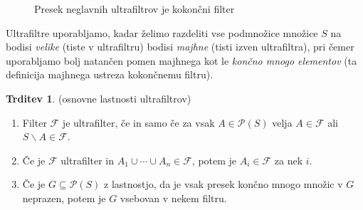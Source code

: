 \documentclass[11pt]{book}
\def\FF{\mathcal{F}}
\def\PP{\mathcal{P}}
\def\UU{\mathcal{U}}
\theoremstyle{definition}
\theoremstyle{zgled}
\theoremstyle{odprtproblem}
\theoremstyle{domacanaloga}
\theoremstyle{izrek}
\newtheorem*{trditev}{Trditev}
\begin{document}
\begin{figure}[t]
\centering
{}
\caption{Presek neglavnih ultrafiltrov je kokončni filter}
\end{figure}


Ultrafiltre uporabljamo, kadar želimo razdeliti vse podmnožice množice $S$ na bodisi {\em velike} (tiste v ultrafiltru) bodisi {\em majhne} (tisti izven ultrafiltra), pri čemer uporabljamo bolj natančen pomen majhnega kot le {\em končno mnogo elementov} (ta definicija majhnega ustreza kokončnemu filtru).

\begin{trditev}{\sc (osnovne lastnosti ultrafiltrov)}
\vspace{-0.5\baselineskip}
\begin{enumerate}[noitemsep]
    \item Filter $\FF$ je ultrafilter, če in samo če za vsak $A \in \PP(S)$ velja $A \in \FF$ ali $S \backslash A \in \FF$.
    \item Če je $\FF$ ultrafilter in $A_1 \cup \cdots \cup A_n \in \FF$, potem je $A_i \in \FF$ za nek $i$.
    \item Če je $G \subseteq \PP(S)$ z lastnostjo, da je vsak presek končno mnogo množic v $G$ neprazen, potem je $G$ vsebovan v nekem filtru. \vspace{-\baselineskip}
\end{enumerate}
\end{trditev}
\end{document}
